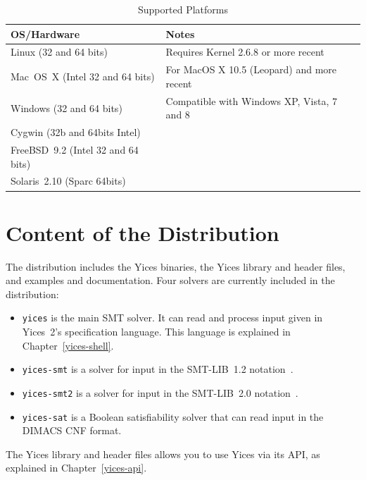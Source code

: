 \documentclass[11pt,twoside,fleqn,openright,titlepage]{cslreport}
\begin{document}
\begin{table}
\begin{center}
\renewcommand{\arraystretch}{1.1}
\begin{tabular}{|l|l|}
\hline
\textbf{OS/Hardware} & \textbf{Notes} \\
\hline
\hline
Linux (32 and 64 bits)    & Requires Kernel 2.6.8 or more recent \\
\hline
Mac~OS~X (Intel 32 and 64 bits) & For MacOS X 10.5 (Leopard) and more recent \\
\hline
Windows (32 and 64 bits) & Compatible with Windows XP, Vista, 7 and 8\\
\hline
Cygwin (32b and 64bits Intel)  &  \\
\hline
FreeBSD~9.2 (Intel 32 and 64 bits) &  \\
\hline
Solaris~2.10 (Sparc 64bits)  & \\
\hline
\end{tabular}
\end{center}
\caption{Supported Platforms}
\label{versions}
\end{table}


\section{Content of  the Distribution}

The distribution includes the Yices binaries, the Yices library and
header files, and examples and documentation.  Four solvers are
currently included in the distribution:
\begin{itemize}
\item \texttt{yices} is  the main SMT solver. It  can read and process
  input given  in Yices~2's  specification language. This  language is
  explained in Chapter~\ref{yices-shell}.

\item  \texttt{yices-smt} is  a solver  for input  in  the SMT-LIB~1.2
  notation~\cite{SMTLIB12:2006}.

\item \texttt{yices-smt2} is a solver for input in the SMT-LIB~2.0
  notation~\cite{SMTLIB20:2012}.

\item \texttt{yices-sat}  is a Boolean satisfiability  solver that can
  read input in the DIMACS CNF format.
\end{itemize}
 The Yices library and header files allows you to use Yices via its
 API, as explained in Chapter~\ref{yices-api}.
\end{document}
